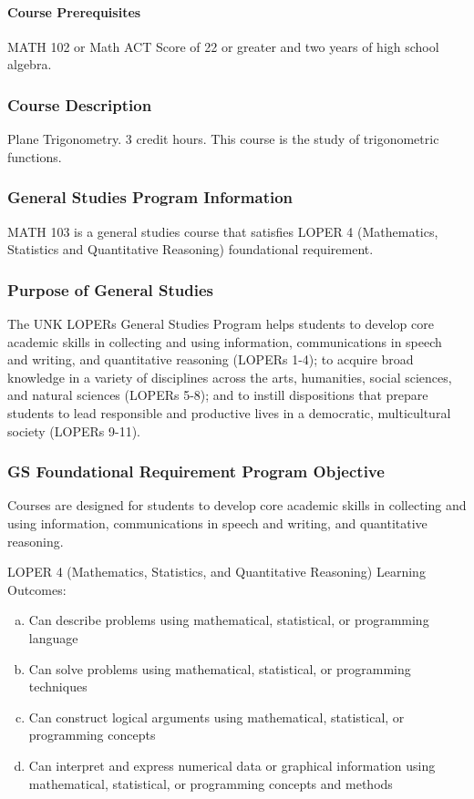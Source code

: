 \documentclass[12pt]{article}
\newcounter{ex}\setcounter{ex}{0}
\newenvironment{alphalist}{
  \begin{enumerate}[(a)]
    \addtolength{\itemsep}{-0.5\itemsep}}
  {\end{enumerate}}
\begin{document}
\paragraph{Course Prerequisites} MATH 102 or Math ACT Score of 22 or greater and two years of high school algebra.

\subsubsection*{Course Description}  Plane Trigonometry.  3 credit hours. This course is the study of trigonometric functions.

\subsubsection*{General Studies Program Information}

MATH 103 is a general studies course that satisfies LOPER 4 (Mathematics, Statistics and Quantitative Reasoning) foundational requirement. 

\subsubsection*{Purpose of General Studies} The UNK LOPERs General Studies Program helps students to develop core academic skills in collecting and using information, communications in speech and writing, and quantitative reasoning (LOPERs 1-4); to acquire broad knowledge in a variety of disciplines across the arts, humanities, social sciences, and natural sciences (LOPERs 5-8); and to instill dispositions that prepare students to lead responsible and productive lives in a democratic, multicultural society (LOPERs 9-11).

\subsubsection*{GS Foundational Requirement Program Objective} Courses 
are designed for students to develop core academic skills in 
collecting and using information, communications in speech and 
writing, and quantitative reasoning.

LOPER 4 (Mathematics, Statistics, and Quantitative Reasoning) Learning Outcomes: 
\begin{alphalist}
    \item  Can describe problems using mathematical, statistical, or programming language 
     \item Can solve problems using mathematical, statistical, or programming techniques 
    \item Can construct logical arguments using mathematical, statistical, or programming concepts 
     \item Can interpret and express numerical data or graphical information using mathematical, statistical, or programming concepts and methods
        \end{alphalist}
\end{document}
